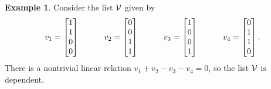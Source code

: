 \documentclass[reqno]{amsart}
\theoremstyle{definition}
\newtheorem{example}[theorem]{Example}
\begin{document}
\begin{example}\label{eg-dep-i}
 Consider the list $\mathcal{V}$ given by
 \[ v_1 = \left[\begin{matrix} 1 \\ 1 \\ 0 \\ 0 \end{matrix}\right] \hspace{3em}
    v_2 = \left[\begin{matrix} 0 \\ 0 \\ 1 \\ 1 \end{matrix}\right] \hspace{3em}
    v_3 = \left[\begin{matrix} 1 \\ 0 \\ 0 \\ 1 \end{matrix}\right] \hspace{3em}
    v_4 = \left[\begin{matrix} 0 \\ 1 \\ 1 \\ 0 \end{matrix}\right].
 \]
 There is a nontrivial linear relation $v_1+v_2-v_3-v_4=0$, so the
 list $\mathcal{V}$ is dependent.
\end{example}
\end{document}
